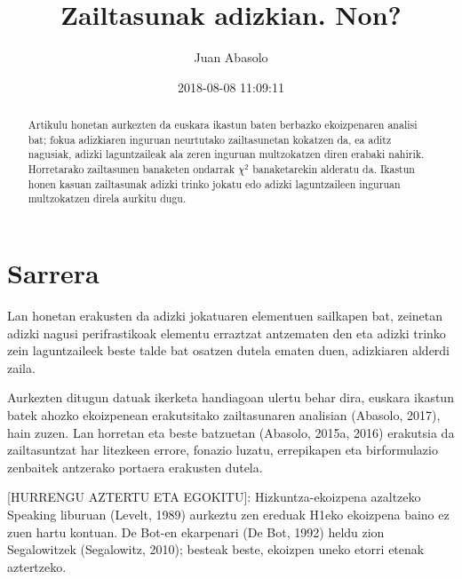 \documentclass[]{article}
\title{Zailtasunak adizkian. Non?}
\author{Juan Abasolo}
\date{2018-08-08 11:09:11}
\begin{document}
\maketitle
\begin{abstract}
Artikulu honetan aurkezten da euskara ikastun baten berbazko
ekoizpenaren analisi bat; fokua adizkiaren inguruan neurtutako
zailtasunetan kokatzen da, ea aditz nagusiak, adizki laguntzaileak ala
zeren inguruan multzokatzen diren erabaki nahirik. Horretarako
zailtasunen banaketen ondarrak \(\chi^2\) banaketarekin alderatu da.
Ikastun honen kasuan zailtasunak adizki trinko jokatu edo adizki
laguntzaileen inguruan multzokatzen direla aurkitu dugu.
\end{abstract}

\section{Sarrera}\label{sarrera}

Lan honetan erakusten da adizki jokatuaren elementuen sailkapen bat,
zeinetan adizki nagusi perifrastikoak elementu erraztzat antzematen den
eta adizki trinko zein laguntzaileek beste talde bat osatzen dutela
ematen duen, adizkiaren alderdi zaila.

Aurkezten ditugun datuak ikerketa handiagoan ulertu behar dira, euskara
ikastun batek ahozko ekoizpenean erakutsitako zailtasunaren analisian
(Abasolo, 2017), hain zuzen. Lan horretan eta beste batzuetan (Abasolo,
2015a, 2016) erakutsia da zailtasuntzat har litezkeen errore, fonazio
luzatu, errepikapen eta birformulazio zenbaitek antzerako portaera
erakusten dutela.

{[}HURRENGU AZTERTU ETA EGOKITU{]}: Hizkuntza-ekoizpena azaltzeko
Speaking liburuan (Levelt, 1989) aurkeztu zen ereduak H1eko ekoizpena
baino ez zuen hartu kontuan. De Bot-en ekarpenari (De Bot, 1992) heldu
zion Segalowitzek (Segalowitz, 2010); besteak beste, ekoizpen uneko
etorri etenak aztertzeko.
\end{document}
